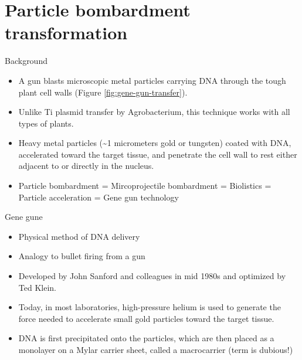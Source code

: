 \documentclass[ignorenonframetext,aspectratio=169]{beamer}
\providecommand{\tightlist}{%
  \setlength{\itemsep}{0pt}\setlength{\parskip}{0pt}}
\begin{document}
\hypertarget{particle-bombardment-transformation}{%
\section{Particle bombardment
transformation}\label{particle-bombardment-transformation}}

\begin{frame}{Background}
\protect\hypertarget{background-1}{}

\begin{itemize}
\tightlist
\item
  A gun blasts microscopic metal particles carrying DNA through the
  tough plant cell walls (Figure \ref{fig:gene-gun-transfer}).
\item
  Unlike Ti plasmid transfer by Agrobacterium, this technique works with
  all types of plants.
\item
  Heavy metal particles (\textasciitilde{}1 micrometers gold or
  tungsten) coated with DNA, accelerated toward the target tissue, and
  penetrate the cell wall to rest either adjacent to or directly in the
  nucleus.
\item
  Particle bombardment = Mircoprojectile bombardment = Biolistics =
  Particle acceleration = Gene gun technology
\end{itemize}

\end{frame}

\begin{frame}{Gene gune}
\protect\hypertarget{gene-gune}{}

\begin{itemize}
\tightlist
\item
  Physical method of DNA delivery
\item
  Analogy to bullet firing from a gun
\item
  Developed by John Sanford and colleagues in mid 1980s and optimized by
  Ted Klein.
\item
  Today, in most laboratories, high-pressure helium is used to generate
  the force needed to accelerate small gold particles toward the target
  tissue.
\item
  DNA is first precipitated onto the particles, which are then placed as
  a monolayer on a Mylar carrier sheet, called a macrocarrier (term is
  dubious!)
\end{itemize}

\end{frame}
\end{document}
